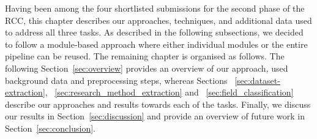 Having been among the four shortlisted submissions for the second phase of the RCC, this chapter describes our approaches, techniques, and additional data used to address all three tasks. As described in the following subsections, we decided to follow a module-based approach where either individual modules or the entire pipeline can be reused. The remaining chapter is organised as follows.
The following Section~\ref{sec:overview} provides an overview of our approach, used background data and preprocessing steps, whereas Sections ~\ref{sec:dataset-extraction}, ~\ref{sec:research_method_extraction} and ~\ref{sec:field_classification} describe our approaches and results towards each of the tasks. Finally, we discuss our results in Section~\ref{sec:discussion} and provide an overview of future work in Section~\ref{sec:conclusion}.











